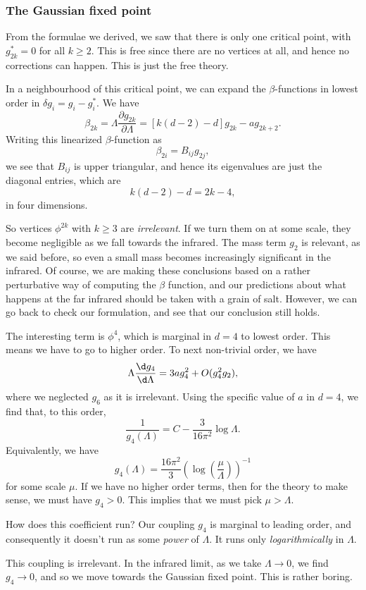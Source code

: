 \documentclass[a4paper]{article}
\begin{document}
\subsubsection*{The Gaussian fixed point}
From the formulae we derived, we saw that there is only one critical point, with $g_{2k}^* = 0$ for all $k \geq 2$. This is free since there are no vertices at all, and hence no corrections can happen. This is just the free theory.

In a neighbourhood of this critical point, we can expand the $\beta$-functions in lowest order in $\delta g_i = g_i - g_i^*$. We have
\[
  \beta_{2k} = \Lambda \frac{\partial g_{2k}}{\partial \Lambda} = [k(d - 2) - d] g_{2k} - a g_{2k + 2}.
\]
Writing this linearized $\beta$-function as
\[
  \beta_{2i} = B_{ij}g_{2j},
\]
we see that $B_{ij}$ is upper triangular, and hence its eigenvalues are just the diagonal entries, which are
\[
  k(d - 2) - d = 2k - 4,
\]
in four dimensions.

So vertices $\phi^{2k}$ with $k \geq 3$ are \emph{irrelevant}. If we turn them on at some scale, they become negligible as we fall towards the infrared. The mass term $g_2$ is relevant, as we said before, so even a small mass becomes increasingly significant in the infrared. Of course, we are making these conclusions based on a rather perturbative way of computing the $\beta$ function, and our predictions about what happens at the far infrared should be taken with a grain of salt. However, we can go back to check our formulation, and see that our conclusion still holds.

The interesting term is $\phi^4$, which is marginal in $d = 4$ to lowest order. This means we have to go to higher order. To next non-trivial order, we have
\[
  \Lambda \frac{\d g_4}{\d \Lambda} = 3a g_4^2 + O(g_4^2g_2),
\]
where we neglected $g_6$ as it is irrelevant. Using the specific value of $a$ in $d = 4$, we find that, to this order,
\[
  \frac{1}{g_4(\Lambda)} = C - \frac{3}{16 \pi^2} \log \Lambda.
\]
Equivalently, we have
\[
  g_4(\Lambda) = \frac{16 \pi^2}{3}\left(\log \left(\frac{\mu}{\Lambda}\right)\right)^{-1}
\]
for some scale $\mu$. If we have no higher order terms, then for the theory to make sense, we must have $g_4 > 0$. This implies that we must pick $\mu > \Lambda$.

How does this coefficient run? Our coupling $g_4$ is marginal to leading order, and consequently it doesn't run as some \emph{power} of $\Lambda$. It runs only \emph{logarithmically} in $\Lambda$.

This coupling is irrelevant. In the infrared limit, as we take $\Lambda \to 0$, we find $g_4 \to 0$, and so we move towards the Gaussian fixed point. This is rather boring.
\end{document}
